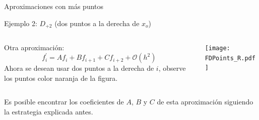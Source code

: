 \documentclass{beamer}
\begin{document}
\begin{frame}{Aproximaciones con más puntos}
%

{\footnotesize 
\begin{block}{Ejemplo 2: $D_{+2}$ (dos puntos a la derecha de $x_o$)}
\begin{columns}[t]
\begin{column}[t]{0.35\textwidth}
Otra aproximación:
% 
\[
f^\prime_i = A f_i + B f_{i+1} + C f_{i+2} + \mathcal{O}(h^2)
\]
Ahora se desean usar dos puntos a la derecha de $i$, observe los puntos color naranja de la figura.
\end{column}
\begin{column}[t]{0.6\textwidth}
\texttt{[image: FDPoints\_R.pdf]}
\end{column}
\end{columns}

Es posible encontrar los coeficientes de $A$, $B$ y $C$ de esta aproximación siguiendo la estrategia
explicada antes.
\end{block}
}
%
\end{frame}
\end{document}
